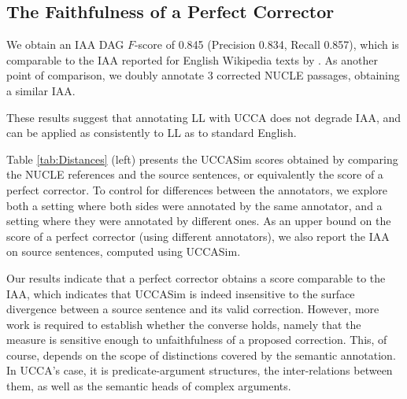\documentclass[letter,11pt]{article}
\begin{document}
%
%
%
\subsection{The Faithfulness of a Perfect Corrector}
We obtain an IAA DAG $F$-score of 0.845
(Precision 0.834, Recall 0.857), which
is comparable to the IAA reported for English Wikipedia texts by \cite{abend2013universal}.
As another point of comparison, we doubly annotate 3 corrected
NUCLE passages, obtaining a similar IAA.

These results suggest that annotating LL with UCCA does not degrade IAA, and can be applied as consistently to LL as to standard English.

Table \ref{tab:Distances} (left)
presents the {\sc UCCASim} scores obtained by comparing the NUCLE references and the source
sentences, or equivalently the score of a perfect corrector.
To control for differences between the annotators, we explore both
a setting where both sides were annotated by the same annotator,
and a setting where they were annotated by different ones.
As an upper bound on the score of a perfect corrector (using different annotators),
we also report the IAA on source sentences, computed using {\sc UCCASim}. 

Our results indicate that a perfect corrector obtains a score comparable
to the IAA, which indicates that {\sc UCCASim} is indeed
insensitive to the surface divergence between a source sentence and its valid correction.
However, more work is required to establish whether the converse holds, namely
that the measure is sensitive enough
to unfaithfulness of a proposed correction.
This, of course, depends on the scope of distinctions covered by the semantic annotation.
In UCCA's case, it is predicate-argument structures, the inter-relations between them,
as well as the semantic heads of complex arguments.
\end{document}
